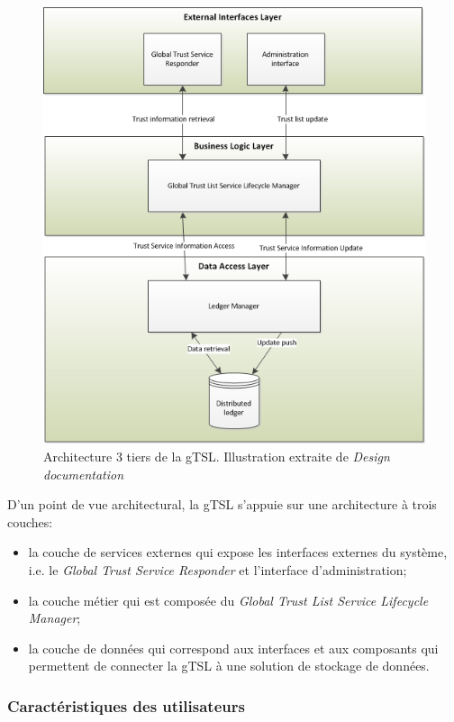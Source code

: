 \documentclass{tnreport}
\begin{document}
\clearpage
\begin{figure}[h]
	\centering
	\includegraphics[scale=0.83]{figures/gTSL-3Tier}
	\caption{Architecture 3 tiers de la gTSL. Illustration extraite de \textit{Design documentation}~\cite{design-document}}
	\label{fig:3tier-archi}
\end{figure}

D'un point de vue architectural, la gTSL s'appuie sur une architecture à trois couches:
\begin{itemize}
	\item la couche de services externes qui expose les interfaces externes du système, i.e. le \textit{Global Trust Service Responder} et l'interface d'administration;
	\item la couche métier qui est composée du \textit{Global Trust List Service Lifecycle Manager};
	\item la couche de données qui correspond aux interfaces et aux composants qui permettent de connecter la gTSL à une solution de stockage de données.
\end{itemize}


\subsubsection{Caractéristiques des utilisateurs}
\end{document}
